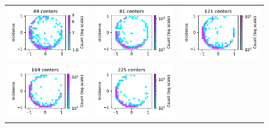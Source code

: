 \documentclass[12pt]{report} %
\begin{document}
\begin{figure}[h]
  \hspace*{-2cm}
  \begin{tabular}{ccc}
    {\includegraphics[width=.4\textwidth]{imagenes/experiments/2d/statistical_2d_full_scheduler_interpolation/parabola/distribution_of_errors_L_inf_end_C49.pdf}} &
    \includegraphics[width=.4\textwidth]{imagenes/experiments/2d/statistical_2d_full_scheduler_interpolation/parabola/distribution_of_errors_L_inf_end_C81.pdf} &
    \includegraphics[width=.4\textwidth]{imagenes/experiments/2d/statistical_2d_full_scheduler_interpolation/parabola/distribution_of_errors_L_inf_end_C121.pdf} \\
    \includegraphics[width=.4\textwidth]{imagenes/experiments/2d/statistical_2d_full_scheduler_interpolation/parabola/distribution_of_errors_L_inf_end_C169.pdf} &
    \includegraphics[width=.4\textwidth]{imagenes/experiments/2d/statistical_2d_full_scheduler_interpolation/parabola/distribution_of_errors_L_inf_end_C225.pdf} &

\end{tabular}
\end{figure}
\end{document}
